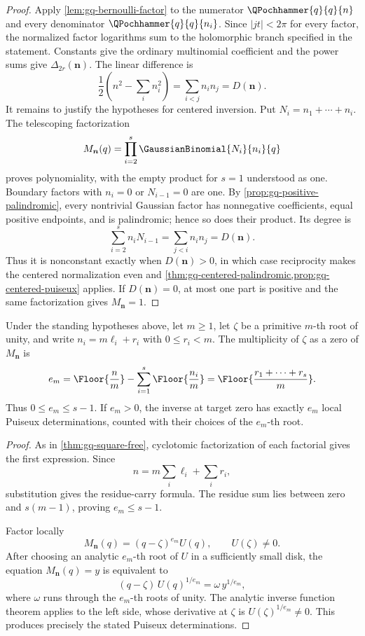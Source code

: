 \begin{proof}
Apply \cref{lem:gq-bernoulli-factor} to the numerator
\(\QPochhammer{q}{q}{n}\) and every denominator
\(\QPochhammer{q}{q}{n_i}\).  Since \(|jt|<2\pi\) for every factor, the
normalized factor logarithms sum to the holomorphic branch specified in the
statement.  Constants give the ordinary multinomial
coefficient and the power sums give \(\Delta_{2r}(\bm n)\).  The linear
difference is
\[
  \frac12\left(n^2-\sum_i n_i^2\right)
  =\sum_{i<j}n_in_j=D(\bm n).
\]
It remains to justify the hypotheses for centered inversion.  Put
\(N_i=n_1+\cdots+n_i\).  The telescoping factorization
\[
 M_{\bm n}(q)=\prod_{i=2}^{s}\GaussianBinomial{N_i}{n_i}{q}
\]
proves polynomiality, with the empty product for \(s=1\) understood as one.
Boundary factors with \(n_i=0\) or \(N_{i-1}=0\) are one.  By
\cref{prop:gq-positive-palindromic}, every nontrivial Gaussian factor has
nonnegative coefficients, equal positive endpoints, and is palindromic;
hence so does their product.
Its degree is
\[
 \sum_{i=2}^{s}n_iN_{i-1}
 =\sum_{j<i}n_in_j=D(\bm n).
\]
Thus it is nonconstant exactly when \(D(\bm n)>0\), in which case
reciprocity makes the centered normalization even and
\cref{thm:gq-centered-palindromic,prop:gq-centered-puiseux} applies.  If
\(D(\bm n)=0\), at most one part is positive and the same factorization gives
\(M_{\bm n}=1\).
\end{proof}

\begin{theorem}
\label{thm:qm-carry}
Under the standing hypotheses above, let \(m\ge1\), let \(\zeta\) be a
primitive \(m\)-th root of unity, and write
\(n_i=m\ell_i+r_i\) with \(0\le r_i<m\).  The multiplicity of \(\zeta\) as
a zero of \(M_{\bm n}\) is
\[
  e_m
  =\Floor{\frac nm}
   -\sum_{i=1}^{s}\Floor{\frac{n_i}{m}}
  =\Floor{\frac{r_1+\cdots+r_s}{m}}.
\]
Thus \(0\le e_m\le s-1\).  If \(e_m>0\), the inverse at target zero has
exactly \(e_m\) local Puiseux determinations, counted with their choices of
the \(e_m\)-th root.
\end{theorem}

\begin{proof}
As in \cref{thm:gq-square-free}, cyclotomic factorization of each factorial
gives the first expression.  Since
\[
  n=m\sum_i\ell_i+\sum_i r_i,
\]
substitution gives the residue-carry formula.  The residue sum lies between
zero and \(s(m-1)\), proving \(e_m\le s-1\).

Factor locally
\[
  M_{\bm n}(q)=(q-\zeta)^{e_m}U(q),
  \qquad U(\zeta)\ne0.
\]
After choosing an analytic \(e_m\)-th root of \(U\) in a sufficiently small
disk, the equation \(M_{\bm n}(q)=y\) is equivalent to
\[
  (q-\zeta)\,U(q)^{1/e_m}=\omega\,y^{1/e_m},
\]
where \(\omega\) runs through the \(e_m\)-th roots of unity.  The analytic
inverse function theorem applies to the left side, whose derivative at
\(\zeta\) is \(U(\zeta)^{1/e_m}\ne0\).  This produces precisely the stated
Puiseux determinations.
\end{proof}

